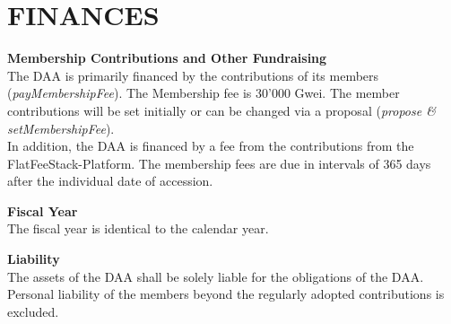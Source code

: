 \section{FINANCES}\label{sec:finances}

\item \textbf{Membership Contributions and Other Fundraising} \\
The DAA is primarily financed by the contributions of its members (\emph{payMembershipFee}).
The Membership fee is 30'000 Gwei.
The member contributions will be set initially or can be changed via a proposal (\emph{propose \& setMembershipFee}). \\
In addition, the DAA is financed by a fee from the contributions from the FlatFeeStack-Platform.
The membership fees are due in intervals of 365 days after the individual date of accession.

\item \textbf{Fiscal Year} \\
The fiscal year is identical to the calendar year.

\item \textbf{Liability} \\
The assets of the DAA shall be solely liable for the obligations of the DAA.
Personal liability of the members beyond the regularly adopted contributions is excluded.
